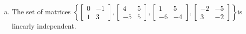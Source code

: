 \begin{exerciseAnswer}
\begin{enumerate}[(a)]
\item The set of matrices \( \left\{ \left[\begin{array}{cc}
0 & -1 \\
1 & 3
\end{array}\right] , \left[\begin{array}{cc}
4 & 5 \\
-5 & 5
\end{array}\right] , \left[\begin{array}{cc}
1 & 5 \\
-6 & -4
\end{array}\right] , \left[\begin{array}{cc}
-2 & -5 \\
3 & -2
\end{array}\right] \right\} \)is linearly independent.
\end{enumerate}
    
\end{exerciseAnswer}
    
